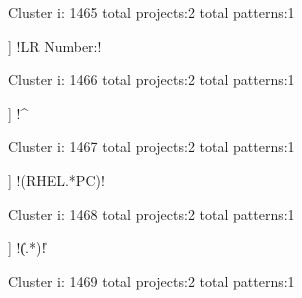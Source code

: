 Cluster i: 1465
total projects:2
total patterns:1
\begin{multicols}{1}
\begin{description}[noitemsep,topsep=0pt]
\item [[2] ] \cverb!LR Number:!
\end{description}
\end{multicols}







Cluster i: 1466
total projects:2
total patterns:1
\begin{multicols}{1}
\begin{description}[noitemsep,topsep=0pt]
\item [[2] ] \cverb!^%
\end{description}
\end{multicols}







Cluster i: 1467
total projects:2
total patterns:1
\begin{multicols}{1}
\begin{description}[noitemsep,topsep=0pt]
\item [[2] ] \cverb!(RHEL.*PC)!
\end{description}
\end{multicols}







Cluster i: 1468
total projects:2
total patterns:1
\begin{multicols}{1}
\begin{description}[noitemsep,topsep=0pt]
\item [[2] ] \cverb!\|(.*)\|!
\end{description}
\end{multicols}







Cluster i: 1469
total projects:2
total patterns:1
\begin{multicols}{1}
\begin{description}[noitemsep,topsep=0pt]
\item [[2] ] \cverb![a-f0-9]+$!
\end{description}
\end{multicols}







